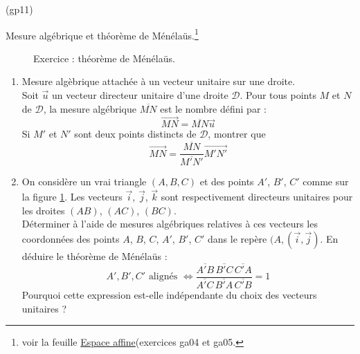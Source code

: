 \begin{tiny}(gp11)\end{tiny} Mesure algébrique et théorème de Ménéla{\"u}s.\footnote{voir la feuille \href{http://back.maquisdoc.net/data/temptex/fexga.pdf}{Espace affine}(exercices ga04 et ga05.}
\begin{figure}[ht]
 \centering

\caption{Exercice : théorème de Ménéla{\"u}s.}
\label{fig:Egp11_1}
\end{figure}

\begin{enumerate}
 \item Mesure algèbrique attachée à un vecteur unitaire sur une droite.\\
Soit $\overrightarrow u$ un vecteur directeur unitaire d'une droite $\mathcal D$. Pour tous points $M$ et $N$ de $\mathcal D$, la mesure algébrique $\overline{MN}$ est le nombre défini par :
\begin{displaymath}
 \overrightarrow{MN} = \overline{MN}\overrightarrow{u}
\end{displaymath}
Si $M'$ et $N'$ sont deux points distincts de $\mathcal D$, montrer que 
\begin{displaymath}
 \overrightarrow{MN} = \dfrac{\overline{MN}}{\overline{M'N'}}\overrightarrow{M'N'}
\end{displaymath}
\item On considère un vrai triangle $(A,B,C)$ et des points $A'$, $B'$, $C'$ comme sur la figure \ref{fig:Egp11_1}. Les vecteurs $\overrightarrow i$, $\overrightarrow j$, $\overrightarrow k$ sont respectivement directeurs unitaires pour les droites $(AB)$, $(AC)$, $(BC)$.\\ Déterminer à l'aide de mesures algébriques relatives à ces vecteurs les coordonnées des points $A$, $B$, $C$, $A'$, $B'$, $C'$ dans le repère $(A,(\overrightarrow i , \overrightarrow j)$. En déduire le théorème de Ménéla{\"u}s :
\begin{displaymath}
 A' , B', C' \text{ alignés } \Leftrightarrow
\dfrac{\overline{A'B}\,\overline{B'C}\,\overline{C'A}}{\overline{A'C}\,\overline{B'A}\,\overline{C'B}}=1
\end{displaymath}
Pourquoi cette expression est-elle indépendante du choix des vecteurs unitaires ?
\end{enumerate}
